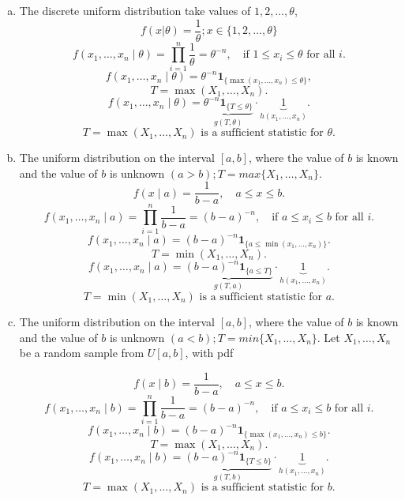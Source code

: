 \documentclass{article}
\begin{document}
\begin{enumerate}[(a)]
\[{			      \prod_{i=1}^{n} (1-x_i)^{\beta-1}
		      }_{h(x_1,\dots,x_n)}.
	      \]
	      \[
		      \boxed{
			      T = \prod_{i=1}^{n} X_i
			      \text{ is a sufficient statistic for } \alpha.
		      }
	      \]
	\item The discrete uniform distribution take values of $1,2,\ldots, \theta$,
	      $$
		      f(x|\theta) = \frac{1}{\theta}; x \in \{1,2,\ldots, \theta\}
	      $$
	      \[
		      f(x_1,\dots,x_n \mid \theta)
		      = \prod_{i=1}^{n} \frac{1}{\theta}
		      = \theta^{-n}, \quad \text{if } 1 \le x_i \le \theta \text{ for all } i.
	      \]
	      \[
		      f(x_1,\dots,x_n \mid \theta)
		      = \theta^{-n} \mathbf{1}_{\{\max(x_1,\dots,x_n) \le \theta\}},
	      \]
	      \[
		      T = \max(X_1,\dots,X_n).
	      \]
	      \[
		      f(x_1,\dots,x_n \mid \theta)
		      =
		      \underbrace{\theta^{-n} \mathbf{1}_{\{T \le \theta\}}}_{g(T,\theta)}
		      \cdot
		      \underbrace{1}_{h(x_1,\dots,x_n)}.
	      \]
	      \[
		      \boxed{
			      T = \max(X_1,\dots,X_n) \text{ is a sufficient statistic for } \theta.
		      }
	      \]
	\item The uniform distribution on the interval $[a,b]$, where the value of $b$ is known and the value of
	      $b$ is unknown $(a>b); T = max\{X_1,\ldots,X_n\}$.
	      \[
		      f(x \mid a) = \frac{1}{b-a}, \quad a \le x \le b.
	      \]
	      \[
		      f(x_1,\dots,x_n \mid a) = \prod_{i=1}^{n} \frac{1}{b-a}
		      = (b-a)^{-n}, \quad \text{if } a \le x_i \le b \text{ for all } i.
	      \]
	      \[
		      f(x_1,\dots,x_n \mid a) = (b-a)^{-n} \mathbf{1}_{\{a \le \min(x_1,\dots,x_n)\}}.
	      \]
	      \[
		      T = \min(X_1,\dots,X_n).
	      \]
	      \[
		      f(x_1,\dots,x_n \mid a)
		      = \underbrace{(b-a)^{-n} \mathbf{1}_{\{a \le T\}}}_{g(T,a)}
		      \cdot
		      \underbrace{1}_{h(x_1,\dots,x_n)}.
	      \]
	      \[
		      \boxed{
			      T = \min(X_1,\dots,X_n) \text{ is a sufficient statistic for } a.
		      }
	      \]
	\item The uniform distribution on the interval $[a,b]$, where the value of $b$ is known and the value of
	      $b$ is unknown $(a<b); T = min\{X_1,\ldots,X_n\}$.
	      Let $X_1,\dots,X_n$ be a random sample from $U[a,b]$, with pdf

	      \[
		      f(x \mid b) = \frac{1}{b-a}, \quad a \le x \le b.
	      \]
	      \[
		      f(x_1,\dots,x_n \mid b) = \prod_{i=1}^{n} \frac{1}{b-a}
		      = (b-a)^{-n}, \quad \text{if } a \le x_i \le b \text{ for all } i.
	      \]
	      \[
		      f(x_1,\dots,x_n \mid b) = (b-a)^{-n} \mathbf{1}_{\{\max(x_1,\dots,x_n) \le b\}}.
	      \]
	      \[
		      T = \max(X_1,\dots,X_n).
	      \]
	      \[
		      f(x_1,\dots,x_n \mid b)
		      = \underbrace{(b-a)^{-n} \mathbf{1}_{\{T \le b\}}}_{g(T,b)}
		      \cdot
		      \underbrace{1}_{h(x_1,\dots,x_n)}.
	      \]
	      \[
		      \boxed{
			      T = \max(X_1,\dots,X_n) \text{ is a sufficient statistic for } b.
		      }
	      \]
\end{enumerate}
\end{document}
